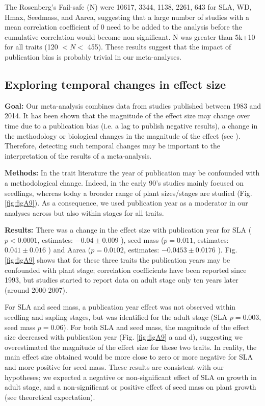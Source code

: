 The Rosenberg's Fail-safe (N) were 10617, 3344, 1138, 2261, 643 for SLA, WD, Hmax, Seedmass, and Aarea, suggesting that a large number of studies with a mean correlation coefficient of 0 need to be added to the analysis before the cumulative correlation would become non-significant. N was greater than 5k+10 for all traits (120 $< N <$ 455).
These results suggest that the impact of publication bias is probably trivial in our meta-analyses.

\subsection{Exploring temporal changes in effect size}
\noindent\textbf{Goal:} Our meta-analysis combines data from studies published between 1983 and 2014. It has been shown that the magnitude of the effect size may change over time due to a publication bias (i.e. a lag to publish negative results), a change in the methodology or biological changes in the magnitude of the effect (see \citealt{Koricheva:2013hy}). Therefore, detecting such temporal changes may be important to the interpretation of the results of a meta-analysis.

\noindent\textbf{Methods:} In the trait literature the year of publication may be confounded with a methodological change. Indeed, in the early 90's studies mainly focused on seedlings, whereas today a broader range of plant sizes/stages are studied (Fig. \ref{fig:figA9}). As a consequence, we used publication year as a moderator in our analyses \citep{Zvereva:2008jm} across but also within stages for all traits.

\noindent\textbf{Results:} There was a change in the effect size with publication year for SLA ($p<0.0001$, estimates: $-0.04 \pm 0.009$ ), seed mass ($p = 0.011$, estimates: $0.041 \pm 0.016$ ) and Aarea ($p = 0.0102$, estimates: $-0.0453 \pm 0.0176$ ). Fig. \ref{fig:figA9} shows that for these three traits the publication years may be confounded with plant stage; correlation coefficients have been reported since 1993, but studies started to report data on adult stage only ten years later (around 2000-2007).

For SLA and seed mass, a publication year effect was not observed within seedling and sapling stages, but was identified for the adult stage (SLA $p = 0.003$, seed mass $p = 0.06$). For both SLA and seed mass, the magnitude of the effect size decreased with publication year (Fig. \ref{fig:figA9} a and d), suggesting we overestimated the magnitude of the effect size for these two traits. In reality, the main effect size obtained would be more close to zero or more negative for SLA and more positive for seed mass. These results are consistent with our hypotheses; we expected a negative or non-significant effect of SLA on growth in adult stage, and a non-significant or positive effect of seed mass on plant growth (see theoretical expectation).

